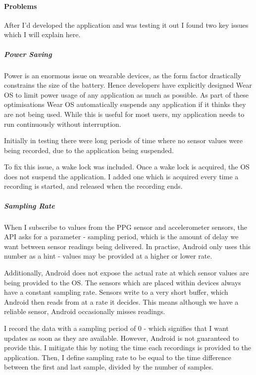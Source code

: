 \documentclass[12pt,a4paper,twoside,openright]{report}
\begin{document}
\paragraph{Problems}

After I'd developed the application and was testing it out I found two key
issues which I will explain here.

\subparagraph{Power Saving}

Power is an enormous issue on wearable devices, as the form factor drastically
constrains the size of the battery. Hence developers have explicitly designed
Wear OS to limit power usage of any application as much as possible. 
As part of these optimisations Wear OS automatically suspends any application
if it thinks they are not being used. While this is useful for most users, my
application needs to run continuously without interruption.

Initially in testing there were long periods of time where no sensor values
were being recorded, due to the application being suspended.

To fix this issue, a wake lock was included. Once a wake lock is acquired, the
OS does not suspend the application. I added one which is acquired every time
a recording is started, and released when the recording ends.

\subparagraph{Sampling Rate}

When I subscribe to values from the PPG sensor and accelerometer sensors, the
API asks for a parameter - sampling period, which is the amount of delay we
want between sensor readings being delivered. In practise, Android only uses
this number as a hint - values may be provided at a higher or lower rate.

Additionally, Android does not expose the actual rate at which sensor values
are being provided to the OS. The sensors which are placed within devices
always have a constant sampling rate. Sensors write to a very short buffer,
which Android then reads from at a rate it decides. This means although we
have a reliable sensor, Android occasionally misses readings.

I record the data with a sampling period of 0 - which signifies that I want
updates as soon as they are available. However, Android is not guaranteed to
provide this. I mitigate this by noting the time each recordings is provided to the
application. Then, I define sampling rate to be equal to the time difference
between the first and last sample, divided by the number of samples.
\end{document}
